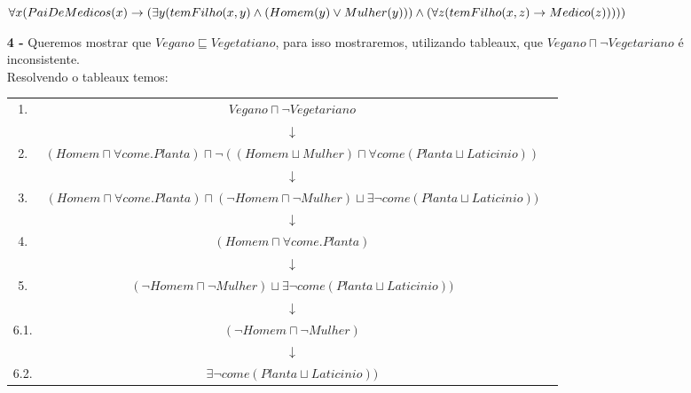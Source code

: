 \documentclass[12pt]{article}
\begin{document}
\begin{itemize}
			\begin{footnotesize}
			$\forall x( PaiDeMedicos(x) \rightarrow \\ (\exists y(temFilho(x, y) \wedge (Homem(y) \vee Mulher(y))) \wedge (\forall z (temFilho(x, z) \rightarrow Medico(z)))))$
			\end{footnotesize}			
		\item[\textbf{4 -}]
			\hfill\newline
			Queremos mostrar que $Vegano \sqsubseteq Vegetatiano$, para isso mostraremos,
			utilizando tableaux, que $Vegano \sqcap \neg Vegetariano$ é inconsistente.\\
			Resolvendo o tableaux temos:\\
			\begin{footnotesize}
				\begin{center}
					\begin{tabular}{ccr}
						1. 	& $Vegano \sqcap \neg Vegetariano$ & \\
							& $\downarrow$ &\\
						2. 	& $(Homem \sqcap \forall come.Planta) \sqcap \neg( (Homem \sqcup Mulher) \sqcap \forall come(Planta \sqcup Laticinio))$ &\\
							& $\downarrow$ &\\
						3. 	& $(Homem \sqcap \forall come.Planta) \sqcap (\neg Homem \sqcap \neg Mulher) \sqcup \exists \neg come(Planta \sqcup Laticinio))$ &\\
							& $\downarrow$ &\\
						4. 	& $(Homem \sqcap \forall come.Planta)$ &\\
							& $\downarrow$ &\\
						5. 	& $(\neg Homem \sqcap \neg Mulher) \sqcup \exists \neg come(Planta \sqcup Laticinio))$ &\\
								& $\downarrow$ &\\
						6.1. 	& $(\neg Homem \sqcap \neg Mulher)$ &\\
								& $\downarrow$ &\\
						6.2. 	& $\exists \neg come(Planta \sqcup Laticinio))$ &\\
					\end{tabular}
				\end{center}
			\end{footnotesize}
	\end{itemize}
\end{document}
